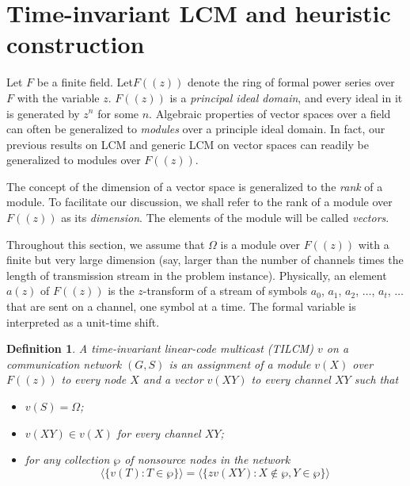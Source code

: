 \documentclass[journal]{IEEEtran}
\newtheorem*{defi}{Definition}
\begin{document}
\section{Time-invariant LCM and heuristic construction}\label{sec:time}
\par
Let $F$ be a finite field. Let$F((z))$ denote the ring of formal power series over $F$ with the variable $z$. $F((z))$ is a \emph{principal ideal domain}, and every ideal in it is generated by $z^n$ for some $n$. Algebraic properties of vector spaces over a field can often be generalized to \emph{modules} over a principle ideal domain. In fact, our previous results on LCM and generic LCM on vector spaces can readily be generalized to modules over $F((z))$.
\par
The concept of the dimension of a vector space is generalized to the \emph{rank} of a module. To facilitate our discussion, we shall refer to the rank of a module over $F((z))$ as its \emph{dimension}. The elements of the module will be called \emph{vectors}.
\par
Throughout this section, we assume that $\Omega$ is a module over $F((z))$ with a finite but very large dimension (say, larger than the number of channels times the length of transmission stream in the problem instance). Physically, an element $a(z)$ of $F((z))$ is the $z$-transform of a stream of symbols $a_0$, $a_1$, $a_2$, $\dots$, $a_t$, $\dots$ that are sent on a channel, one symbol at a time. The formal variable is interpreted as a unit-time shift.
\begin{defi}
	A \emph{time-invariant linear-code multicast (TILCM)} $v$ on a communication network $(G,S)$ is an assignment of a module $v(X)$ over $F((z))$ to every node $X$ and a vector $v(XY)$ to every channel $XY$ such that
	\begin{itemize}
		\item[1)] $v(S)=\Omega$;
		\item[2)] $v(XY)\in v(X)$ for every channel $XY$;
		\item[3)] for any collection $\wp$ of nonsource nodes in the network 
		$$ \langle \{v(T):T \in \wp\} \rangle=\langle \{zv(XY):X\notin \wp, Y\in \wp\}\rangle$$
	\end{itemize}
\end{defi}
\end{document}
